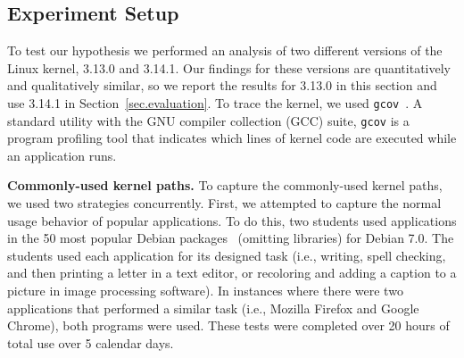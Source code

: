 %
%

\subsection{Experiment Setup}

To test our hypothesis we performed an analysis of two different versions of
the Linux kernel, 3.13.0 and 3.14.1.  Our findings for these
versions are quantitatively and qualitatively similar, so we report 
the results for 3.13.0 in this section and use 3.14.1 in Section~\ref{sec.evaluation}.
To trace the kernel, we used \texttt{gcov}~\cite{gcov}. A standard utility with
the GNU compiler collection (GCC) suite,
\texttt{gcov} is a program profiling tool that indicates which lines of kernel
code are executed while an application runs.

\textbf{Commonly-used kernel paths.}
To capture the commonly-used kernel paths, we used two strategies concurrently.
First, we attempted to capture the normal usage behavior of popular applications.
To do this, two students used
applications in the 50 most popular Debian packages~\cite{Top-Packages}
(omitting libraries) for Debian 7.0.
The students used each application for its designed
task (i.e., writing, spell checking, and then printing a letter in a text
editor, or recoloring and adding a caption to a picture in image processing
software). In instances where there were two applications that performed a
similar task (i.e., Mozilla Firefox and Google Chrome), both programs were
used. These tests were completed over 20 hours of
total use over 5 calendar days.

